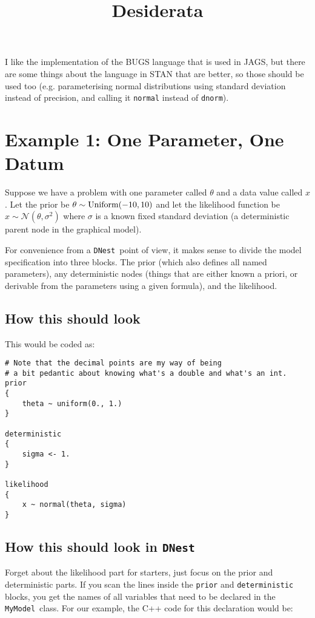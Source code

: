 \documentclass[letterpaper, 11pt]{article}
\title{Desiderata}
\newcommand{\dnest}{{\tt DNest}}
\newcommand{\mymodel}{{\tt MyModel}}
\begin{document}
\maketitle


I like the implementation of the BUGS language that is used in JAGS, but there
are some things about the language in STAN that are better, so those should
be used too (e.g. parameterising normal distributions using standard deviation
instead of precision, and calling it {\tt normal} instead of {\tt dnorm}).

\section{Example 1: One Parameter, One Datum}
Suppose we have a problem with one parameter called $\theta$ and a data value
called $x$. Let
the prior be $\theta \sim \textnormal{Uniform}(-10, 10)$ and let the likelihood
function
be $x \sim \mathcal{N}(\theta, \sigma^2)$ where $\sigma$ is a known fixed
standard deviation (a deterministic parent node in the graphical model).

For convenience from a \dnest~point of view, it makes sense to divide
the model specification into three blocks. The prior (which also defines all
named parameters), any deterministic nodes (things that are either known
a priori, or
derivable from the parameters using a given formula), and the likelihood.

\subsection{How this should look}

This would be coded as:
\begin{verbatim}
# Note that the decimal points are my way of being
# a bit pedantic about knowing what's a double and what's an int.
prior
{
    theta ~ uniform(0., 1.)
}

deterministic
{
    sigma <- 1.
}

likelihood
{
    x ~ normal(theta, sigma)
}
\end{verbatim}

\subsection{How this should look in \dnest}
Forget about the likelihood part for starters, just focus on the prior and
deterministic parts. If you scan the lines inside the {\tt prior} and
{\tt deterministic} blocks, you get the names of all variables that need to
be declared in the \mymodel~class. For our example, the C++ code for this
declaration would be:
\end{document}
